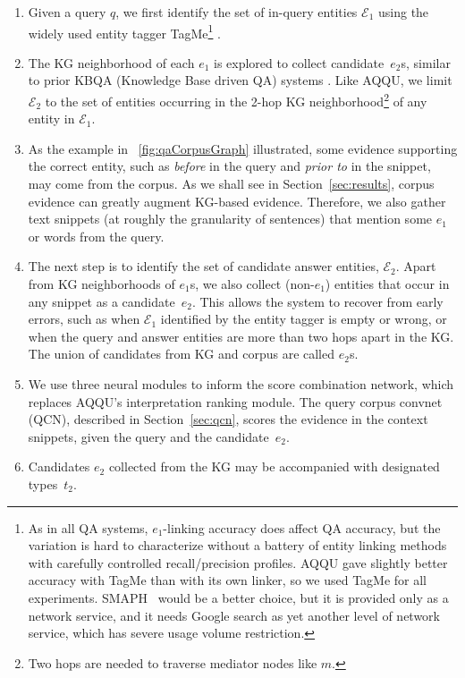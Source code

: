 \documentclass{svjour3}
\begin{document}
\begin{enumerate}
\item Given a query $q$, we first identify the set of in-query entities $\mathcal{E}_1$ using the widely used entity tagger TagMe\footnote{As in all QA systems, $e_1$-linking accuracy does affect QA accuracy, but the variation is hard to characterize without a battery of entity linking methods with carefully controlled recall/precision profiles.  AQQU gave slightly better accuracy with TagMe than with its own linker, so we used TagMe for all experiments.  SMAPH~\citep{CornoltiFCRS2014SMAPH} would be a better choice, but it is provided only as a network service, and it needs Google search as yet another level of network service, which has severe usage volume restriction.} \citep{FerraginaS2010TagMe}.
\item The KG neighborhood of each $e_1$ is explored to collect candidate~$e_2$s, similar to prior KBQA (Knowledge Base driven QA) systems \citep{BastH2015aqqu,YihCHG2015STAGG,XuRFHZ2016FbCorpusQA}.  Like AQQU, we limit $\mathcal{E}_2$ to the set of entities occurring in the 2-hop KG neighborhood\footnote{Two hops are needed to traverse mediator nodes like $m$.} of any entity in $\mathcal{E}_1$.
\item As the example in \figurename~\ref{fig:qaCorpusGraph} illustrated, some evidence supporting the correct entity, such as \emph{before} in the query and \emph{prior to} in the snippet, may come from the corpus.  As we shall see in Section~\ref{sec:results}, corpus evidence can greatly augment KG-based evidence.  Therefore, we also gather text snippets (at roughly the granularity of sentences) that mention some $e_1$ or words from the query.  
\item The next step is to identify the set of candidate answer entities, $\mathcal{E}_2$.  Apart from KG neighborhoods of $e_1$s, we also collect (non-$e_1$) entities that occur in any snippet as a candidate~$e_2$.  This allows the system to recover from early errors, such as when $\mathcal{E}_1$ identified by the entity tagger is empty or wrong, or when the query and answer entities are more than two hops apart in the KG.  The union of candidates from KG and corpus are called $e_2$s.
\item We use three neural modules to inform the score combination network, which replaces AQQU's interpretation ranking module.  The query corpus convnet (QCN), described in Section~\ref{sec:qcn}, scores the evidence in the context snippets, given the query and the candidate~$e_2$.
\item Candidates $e_2$ collected from the KG may be accompanied with designated types~$t_2$.

\end{enumerate}
\end{document}
